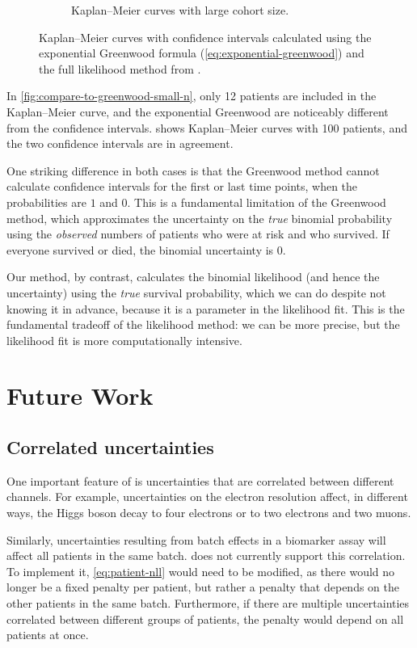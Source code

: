 \documentclass[article]{jss}
\newcommand{\KM}{Kaplan--Meier} %
\begin{document}
\begin{figure}
\begin{subfigure}[t]{0.49\textwidth}
  \caption{\label{fig:compare-to-greenwood-large-n} \KM{} curves with large cohort size.}
\end{subfigure}
\caption{\label{fig:compare-to-greenwood} \KM{} curves with confidence intervals calculated using the exponential Greenwood formula (\cref{eq:exponential-greenwood}) and the full likelihood method from .}
\end{figure}

In \cref{fig:compare-to-greenwood-small-n}, only 12 patients are included in the \KM{} curve, and the exponential Greenwood are noticeably different from the  confidence intervals.   shows \KM{} curves with 100 patients, and the two confidence intervals are in agreement.

One striking difference in both cases is that the Greenwood method cannot calculate confidence intervals for the first or last time points, when the probabilities are \(1\) and \(0\).  This is a fundamental limitation of the Greenwood method, which approximates the uncertainty on the \emph{true} binomial probability using the \emph{observed} numbers of patients who were at risk and who survived.  If everyone survived or died, the binomial uncertainty is \(0\).

Our method, by contrast, calculates the binomial likelihood (and hence the uncertainty) using the \emph{true} survival probability, which we can do despite not knowing it in advance, because it is a parameter in the likelihood fit.  This is the fundamental tradeoff of the likelihood method: we can be more precise, but the likelihood fit is more computationally intensive.

\section{Future Work}

\subsection{Correlated uncertainties}

One important feature of  is uncertainties that are correlated between different channels.  For example, uncertainties on the electron resolution affect, in different ways, the Higgs boson decay to four electrons or to two electrons and two muons.

Similarly, uncertainties resulting from batch effects in a biomarker assay will affect all patients in the same batch\@.   does not currently support this correlation.  To implement it, \cref{eq:patient-nll} would need to be modified, as there would no longer be a fixed penalty per patient, but rather a penalty that depends on the other patients in the same batch.  Furthermore, if there are multiple uncertainties correlated between different groups of patients, the penalty would depend on all patients at once.
\end{document}
